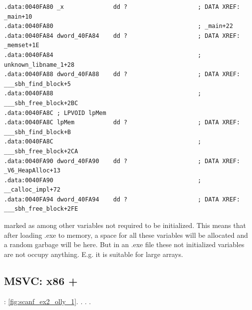 \begin{lstlisting}
.data:0040FA80 _x              dd ?                    ; DATA XREF: _main+10
.data:0040FA80                                         ; _main+22
.data:0040FA84 dword_40FA84    dd ?                    ; DATA XREF: _memset+1E
.data:0040FA84                                         ; unknown_libname_1+28
.data:0040FA88 dword_40FA88    dd ?                    ; DATA XREF: ___sbh_find_block+5
.data:0040FA88                                         ; ___sbh_free_block+2BC
.data:0040FA8C ; LPVOID lpMem
.data:0040FA8C lpMem           dd ?                    ; DATA XREF: ___sbh_find_block+B
.data:0040FA8C                                         ; ___sbh_free_block+2CA
.data:0040FA90 dword_40FA90    dd ?                    ; DATA XREF: _V6_HeapAlloc+13
.data:0040FA90                                         ; __calloc_impl+72
.data:0040FA94 dword_40FA94    dd ?                    ; DATA XREF: ___sbh_free_block+2FE
\end{lstlisting}

{ marked as  among other variables not required to be initialized. 
This means that after loading .exe to memory, a space for all these variables will be 
allocated and a random garbage will be here. 
But in an .exe file these not initialized variables are not occupy anything. 
E.g. it is suitable for large arrays.}

\subsection{MSVC: x86 + \olly}
\index{\olly}

: \figname \ref{fig:scanf_ex2_olly_1}.
.
.
.

